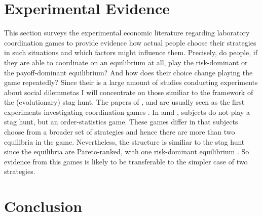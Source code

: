 \documentclass[12pt]{article}
\begin{document}
\section{Experimental Evidence}
This section surveys the experimental economic literature regarding 
laboratory coordination games to provide evidence how actual people choose
their strategies in such situations and which factors might influence them. 
Precisely, do people, if they are able to coordinate on an equilibrium at all,
play the risk-dominant or the payoff-dominant equilibrium? And how does their
choice change playing the game repeatedly?
Since their is a large amount of studies conducting experiments about
social dilemmetas I will concentrate on those similiar to the framework
of the (evolutionary) stag hunt. 
The papers of \cite{vanhuyck1990}, \cite{vanhuyck1991} and \cite{copperdejong1992} are usually 
seen as the first experiments investigating coordination games \cite{whenandwhy}.
In \cite{vanhuyck1990} amd \cite{vanhuyck1991}, subjects do not play a stag
hunt, but an order-statistics game. These games differ in that subjects choose
from a broader set of strategies and hence there are more than two equilibria
in the game. Nevertheless, the structure is similiar to the stag hunt since
the equilibria are Pareto-ranked, with one risk-dominant equilibrium \cite{when
andwhy}. So evidence from this games is likely to be transferable to the 
simpler case of two strategies. 











































\section{Conclusion}
\printbibliography
\end{document}
